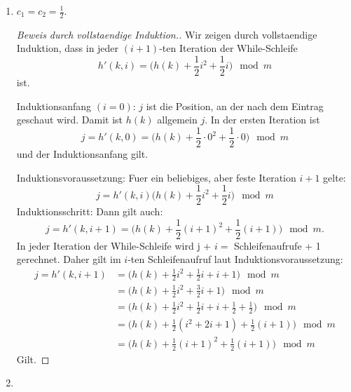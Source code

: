 \documentclass{scrartcl} %
\begin{document}
    \begin{aufgabe}
        \begin{enumerate}[label=(\alph*)]
            \item \begin{theorem*}
                $c_1 = c_2 = \frac{1}{2}$.
            \end{theorem*}
            \begin{proof}[Beweis durch vollstaendige Induktion.]
                Wir zeigen durch vollstaendige Induktion, dass in jeder $(i + 1)$-ten Iteration der While-Schleife
                \[
                    h'(k, i) = \Big(h(k) + \frac{1}{2}i^2 + \frac{1}{2}i\Big) \mod m
                \]
                ist.
                
                Induktionsanfang $(i = 0)$: $j$ ist die Position, an der nach dem Eintrag geschaut wird. Damit ist $h(k)$ allgemein $j$. In der ersten Iteration ist 
                \[
                    j = h'(k, 0) = \Big(h(k) + \frac{1}{2}\cdot 0^2 + \frac{1}{2}\cdot 0\Big) \mod m
                \]
                und der Induktionsanfang gilt.

                Induktionsvoraussetzung: Fuer ein beliebiges, aber feste Iteration $i + 1$ gelte:
                \[
                    j = h'(k, i) \Big(h(k) + \frac{1}{2}i^2 + \frac{1}{2}i\Big)\mod m
                \]
                Induktionsschritt: Dann gilt auch:
                \[
                    j = h'(k, i + 1) = \Big(h(k) + \frac{1}{2}(i + 1)^2 + \frac{1}{2}(i + 1)\Big)\mod m.
                \]
                In jeder Iteration der While-Schleife wird j + $i =$ Schleifenaufrufe + 1 gerechnet. Daher gilt im $i$-ten Schleifenaufruf laut Induktionsvoraussetzung:
                \begin{align*}
                    j = h'(k, i + 1) &= \Big(h(k) + \frac{1}{2}i^2 + \frac{1}{2}i + i + 1\Big)\mod m\\
                    &= \Big(h(k) + \frac{1}{2}i^2 + \frac{3}{2}i + 1\Big)\mod m\\
                    &= \Big(h(k) + \frac{1}{2}i^2 + \frac{1}{2}i + i + \frac{1}{2} + \frac{1}{2}\Big) \mod m\\
                    &= \Big(h(k) + \frac{1}{2}(i^2 + 2i + 1) + \frac{1}{2}(i + 1)\Big)\mod m\\
                    &= \Big(h(k) + \frac{1}{2}(i + 1)^2 + \frac{1}{2}(i + 1)\Big)\mod m
                \end{align*}
                Gilt.
            \end{proof}
            \item 
        \end{enumerate}
    \end{aufgabe}
    \begin{aufgabe}
    
    \end{aufgabe}
\end{document}
